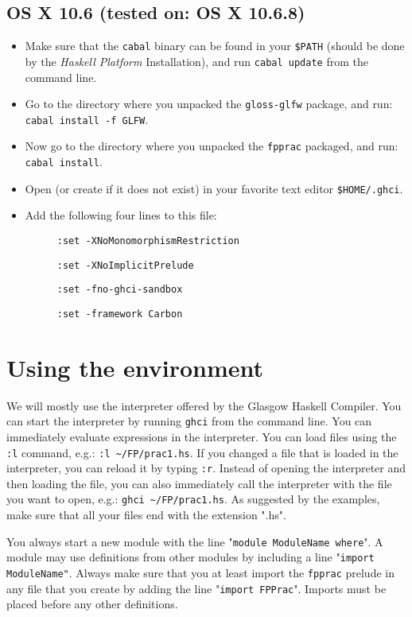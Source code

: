 \documentclass[]{article}
\begin{document}
\subsection{OS X 10.6 (tested on: OS X 10.6.8)}
\begin{itemize}
  \item Make sure that the \verb!cabal! binary can be found in your \verb!$PATH! (should be done by the \emph{Haskell Platform} Installation), and run \verb!cabal update! from the command line.
  \item Go to the directory where you unpacked the \verb!gloss-glfw! package, and run: \verb!cabal install -f GLFW!.
  \item Now go to the directory where you unpacked the \verb!fpprac! packaged, and run: \verb!cabal install!.
  \item Open (or create if it does not exist) in your favorite text editor \verb!$HOME/.ghci!.
  \item Add the following four lines to this file:
  \begin{description}
    \item[] \verb!:set -XNoMonomorphismRestriction!
    \item[] \verb!:set -XNoImplicitPrelude!
    \item[] \verb!:set -fno-ghci-sandbox!
    \item[] \verb!:set -framework Carbon!
  \end{description}
\end{itemize}

\section{Using the environment}
We will mostly use the interpreter offered by the Glasgow Haskell Compiler. You can start the interpreter by running \verb!ghci! from the command line. You can immediately evaluate expressions in the interpreter. You can load files using the \verb!:l! command, e.g.: \verb!:l ~/FP/prac1.hs!. If you changed a file that is loaded in the interpreter, you can reload it by typing \verb!:r!. Instead of opening the interpreter and then loading the file, you can also immediately call the interpreter with the file you want to open, e.g.: \verb!ghci ~/FP/prac1.hs!. As suggested by the examples, make sure that all your files end with the extension ".hs".

You always start a new module with the line "\verb!module ModuleName where!". A module may use definitions from other modules by including a line "\verb!import ModuleName"!. Always make sure that you at least import the \verb!fpprac! prelude in any file that you create by adding the line "\verb!import FPPrac!". Imports must be placed before any other definitions.
\end{document}
